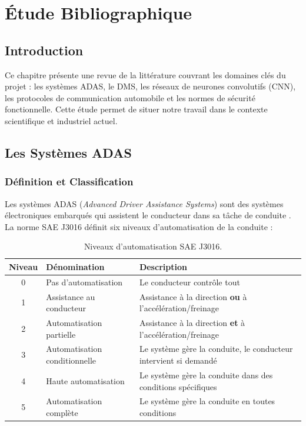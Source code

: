 
\chapter{Étude Bibliographique}

\section{Introduction}

Ce chapitre présente une revue de la littérature couvrant les domaines clés du projet : les systèmes ADAS, le DMS, les réseaux de neurones convolutifs (CNN), les protocoles de communication automobile et les normes de sécurité fonctionnelle. Cette étude permet de situer notre travail dans le contexte scientifique et industriel actuel.

\section{Les Systèmes ADAS}

\subsection{Définition et Classification}

Les systèmes ADAS (\textit{Advanced Driver Assistance Systems}) sont des systèmes électroniques embarqués qui assistent le conducteur dans sa tâche de conduite \cite{bengio2020}. La norme SAE J3016 \cite{sae2021} définit six niveaux d'automatisation de la conduite :

\begin{table}[H]
\centering
\caption{Niveaux d'automatisation SAE J3016.}
\label{tab:sae_levels}
\renewcommand{\arraystretch}{1.3}
\begin{tabularx}{\textwidth}{|c|l|X|}
\hline
\rowcolor{stellantisblue!15}
\textbf{Niveau} & \textbf{Dénomination} & \textbf{Description} \\
\hline
0 & Pas d'automatisation & Le conducteur contrôle tout \\
\hline
1 & Assistance au conducteur & Assistance à la direction \textbf{ou} à l'accélération/freinage \\
\hline
2 & Automatisation partielle & Assistance à la direction \textbf{et} à l'accélération/freinage \\
\hline
3 & Automatisation conditionnelle & Le système gère la conduite, le conducteur intervient si demandé \\
\hline
4 & Haute automatisation & Le système gère la conduite dans des conditions spécifiques \\
\hline
5 & Automatisation complète & Le système gère la conduite en toutes conditions \\
\hline
\end{tabularx}
\end{table}

